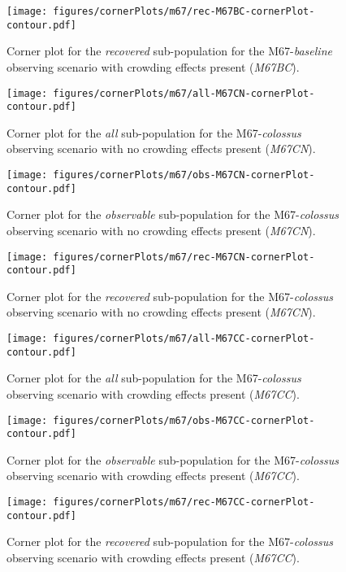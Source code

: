 \documentclass[twocolumn]{aastex63}
\begin{document}
\begin{figure}
    \centering
    \texttt{[image: figures/cornerPlots/m67/rec-M67BC-cornerPlot-contour.pdf]}
    \caption{Corner plot for the \textit{recovered} sub-population for the M67-\textit{baseline} observing scenario with crowding effects present (\textit{M67BC}).}
    \label{fig:m67bc-Rec-corner-plot-appendix}
\end{figure}\clearpage
\begin{figure}
    \centering
    \texttt{[image: figures/cornerPlots/m67/all-M67CN-cornerPlot-contour.pdf]}
    \caption{Corner plot for the \textit{all} sub-population for the M67-\textit{colossus} observing scenario with no crowding effects present (\textit{M67CN}).}
    \label{fig:m67cn-All-corner-plot-appendix}
\end{figure}\clearpage
\begin{figure}
    \centering
    \texttt{[image: figures/cornerPlots/m67/obs-M67CN-cornerPlot-contour.pdf]}
    \caption{Corner plot for the \textit{observable} sub-population for the M67-\textit{colossus} observing scenario with no crowding effects present (\textit{M67CN}).}
    \label{fig:m67cn-Obs-corner-plot-appendix}
\end{figure}\clearpage
\begin{figure}
    \centering
    \texttt{[image: figures/cornerPlots/m67/rec-M67CN-cornerPlot-contour.pdf]}
    \caption{Corner plot for the \textit{recovered} sub-population for the M67-\textit{colossus} observing scenario with no crowding effects present (\textit{M67CN}).}
    \label{fig:m67cn-Rec-corner-plot-appendix}
\end{figure}\clearpage
\begin{figure}
    \centering
    \texttt{[image: figures/cornerPlots/m67/all-M67CC-cornerPlot-contour.pdf]}
    \caption{Corner plot for the \textit{all} sub-population for the M67-\textit{colossus} observing scenario with crowding effects present (\textit{M67CC}).}
    \label{fig:m67cc-All-corner-plot-appendix}
\end{figure}\clearpage
\begin{figure}
    \centering
    \texttt{[image: figures/cornerPlots/m67/obs-M67CC-cornerPlot-contour.pdf]}
    \caption{Corner plot for the \textit{observable} sub-population for the M67-\textit{colossus} observing scenario with crowding effects present (\textit{M67CC}).}
    \label{fig:m67cc-Obs-corner-plot-appendix}
\end{figure}\clearpage
\begin{figure}
    \centering
    \texttt{[image: figures/cornerPlots/m67/rec-M67CC-cornerPlot-contour.pdf]}
    \caption{Corner plot for the \textit{recovered} sub-population for the M67-\textit{colossus} observing scenario with crowding effects present (\textit{M67CC}).}
    \label{fig:m67cc-Rec-corner-plot-appendix}
\end{figure}\clearpage
\end{document}
